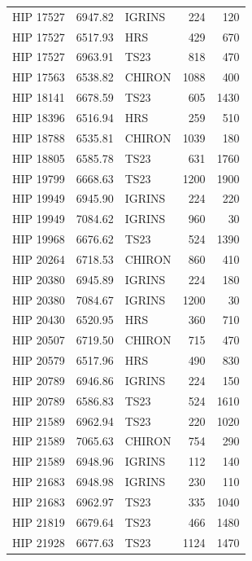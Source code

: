 {\begin{scriptsize}
\begin{longtable}{|l|rlrr|}
   HIP 17527 &  6947.82 &     IGRINS &      224 &   120 \\
   HIP 17527 &  6517.93 &        HRS &      429 &   670 \\
   HIP 17527 &  6963.91 &       TS23 &      818 &   470 \\
   HIP 17563 &  6538.82 &     CHIRON &     1088 &   400 \\
   HIP 18141 &  6678.59 &       TS23 &      605 &  1430 \\
   HIP 18396 &  6516.94 &        HRS &      259 &   510 \\
   HIP 18788 &  6535.81 &     CHIRON &     1039 &   180 \\
   HIP 18805 &  6585.78 &       TS23 &      631 &  1760 \\
   HIP 19799 &  6668.63 &       TS23 &     1200 &  1900 \\
   HIP 19949 &  6945.90 &     IGRINS &      224 &   220 \\
   HIP 19949 &  7084.62 &     IGRINS &      960 &    30 \\
   HIP 19968 &  6676.62 &       TS23 &      524 &  1390 \\
   HIP 20264 &  6718.53 &     CHIRON &      860 &   410 \\
   HIP 20380 &  6945.89 &     IGRINS &      224 &   180 \\
   HIP 20380 &  7084.67 &     IGRINS &     1200 &    30 \\
   HIP 20430 &  6520.95 &        HRS &      360 &   710 \\
   HIP 20507 &  6719.50 &     CHIRON &      715 &   470 \\
   HIP 20579 &  6517.96 &        HRS &      490 &   830 \\
   HIP 20789 &  6946.86 &     IGRINS &      224 &   150 \\
   HIP 20789 &  6586.83 &       TS23 &      524 &  1610 \\
   HIP 21589 &  6962.94 &       TS23 &      220 &  1020 \\
   HIP 21589 &  7065.63 &     CHIRON &      754 &   290 \\
   HIP 21589 &  6948.96 &     IGRINS &      112 &   140 \\
   HIP 21683 &  6948.98 &     IGRINS &      230 &   110 \\
   HIP 21683 &  6962.97 &       TS23 &      335 &  1040 \\
   HIP 21819 &  6679.64 &       TS23 &      466 &  1480 \\
   HIP 21928 &  6677.63 &       TS23 &     1124 &  1470 \\

\end{longtable}
\end{scriptsize}}
